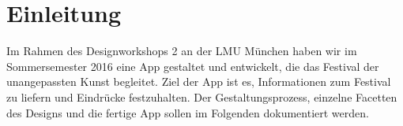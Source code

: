 \section{Einleitung}
Im Rahmen des Designworkshops 2 an der LMU München haben wir im Sommersemester 2016 eine App gestaltet und entwickelt, die das Festival der unangepassten Kunst begleitet. Ziel der App ist es, Informationen zum Festival zu liefern und Eindrücke festzuhalten. Der Gestaltungsprozess, einzelne Facetten des Designs und die fertige App sollen im Folgenden dokumentiert werden.